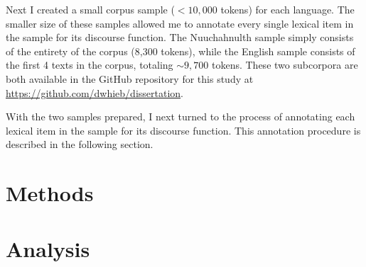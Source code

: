 Next I created a small corpus sample ($<10,000$ tokens) for each language. The smaller size of these samples allowed me to annotate every single lexical item in the sample for its discourse function. The Nuuchahnulth sample simply consists of the entirety of the corpus (8,300 tokens), while the English sample consists of the first 4 texts in the corpus, totaling $\sim9,700$ tokens. These two subcorpora are both available in the GitHub repository for this study at \url{https://github.com/dwhieb/dissertation}.

With the two samples prepared, I next turned to the process of annotating each lexical item in the sample for its discourse function. This annotation procedure is described in the following section.

\section{Methods}
\label{sec:3.3}

\section{Analysis}
\label{sec:3.4}
